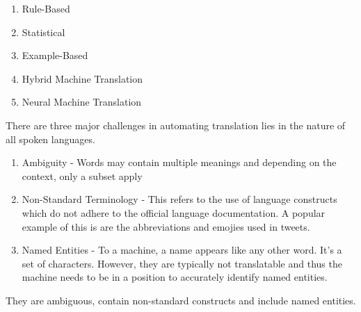\documentclass[10pt,a4paper,titlepage,twoside,english]{zhawreprt}
\begin{document}
\begin{enumerate}
	
	\item Rule-Based
	\item Statistical
	\item Example-Based
	\item Hybrid Machine Translation
	\item Neural Machine Translation
	
\end{enumerate}
There are three major challenges in automating translation lies in the nature of all spoken languages. 
\begin{enumerate}
	\item Ambiguity - Words may contain multiple meanings and depending on the context, only a subset apply
	\item Non-Standard Terminology - This refers to the use of language constructs which do not adhere to the official language documentation. A popular example of this is are the abbreviations and emojies used in tweets.
	\item Named Entities - To a machine, a name appears like any other word. It's a set of characters. However, they are typically not translatable and thus the machine needs to be in a position to accurately identify named entities. 
\end{enumerate}
They are ambiguous, contain non-standard constructs and include named entities.  
\end{document}
